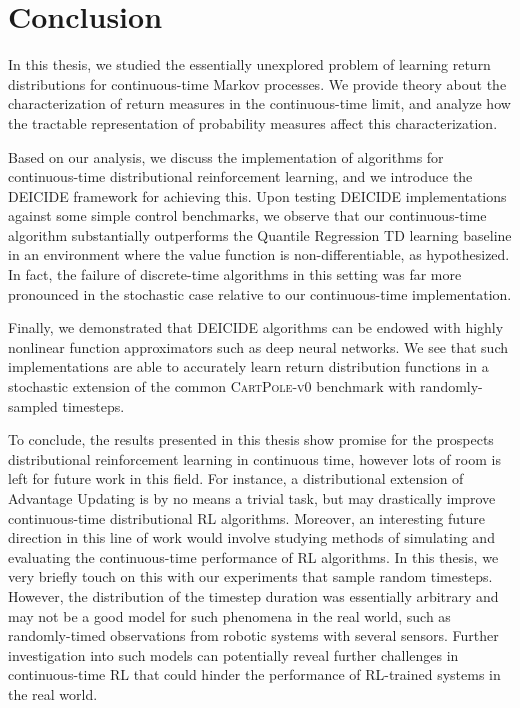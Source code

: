 \chapter{Conclusion}
In this thesis, we studied the essentially unexplored problem of
learning return distributions for continuous-time Markov processes. We
provide theory about the characterization of return measures in the
continuous-time limit, and analyze how the tractable representation of
probability measures affect this characterization.

Based on our analysis, we discuss the implementation of 
algorithms for continuous-time distributional reinforcement learning,
and we introduce the DEICIDE framework for achieving this.
Upon testing DEICIDE implementations against some simple control
benchmarks, we observe that our continuous-time algorithm
substantially outperforms the Quantile Regression TD learning baseline
in an environment where the value function is non-differentiable, as
hypothesized.  In fact, the failure of discrete-time algorithms in
this setting was far more pronounced in the stochastic case relative
to our continuous-time implementation.

Finally, we demonstrated that DEICIDE algorithms can be endowed with
highly nonlinear function approximators such as deep neural
networks. We see that such implementations are able to accurately
learn return distribution functions in a stochastic extension of the
common \textsc{CartPole-v0} benchmark with randomly-sampled timesteps.

To conclude, the results presented in this thesis show promise for
the prospects distributional reinforcement learning in continuous
time, however lots of room is left for future work in this field. For
instance, a distributional extension of Advantage Updating
\citep{baird1993advantage} is by no means a trivial task, but may
drastically improve continuous-time distributional RL
algorithms. Moreover, an interesting future direction in this line of
work would involve studying methods of simulating and evaluating the
continuous-time performance of RL algorithms. In this thesis, we very
briefly touch on this with our experiments that sample random
timesteps. However, the distribution of the timestep duration was
essentially arbitrary and may not be a good model for such phenomena
in the real world, such as randomly-timed observations from robotic
systems with several sensors. Further investigation into such models
can potentially reveal further challenges in continuous-time RL that
could hinder the performance of RL-trained systems in the real world.